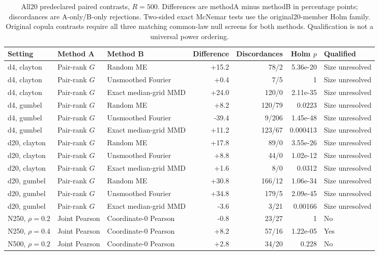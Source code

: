 \begin{table}[t]
\centering
\scriptsize
\caption{All20 predeclared paired contrasts, $R=500$. Differences are methodA minus methodB in percentage points; discordances are A-only/B-only rejections. Two-sided exact McNemar tests use the original20-member Holm family. Original copula contrasts require all three matching common-law null screens for both methods. Qualification is not a universal power ordering.}
\label{tab:dependence-paired-contrasts}
{\setlength{\tabcolsep}{8pt}\renewcommand{\arraystretch}{1.2}
\begin{tabular}{lllrrrl}
\toprule
Setting & Method A & Method B & Difference & Discordances & Holm $p$ & Qualified\\
\midrule
d4, clayton & Pair-rank $G$ & Random ME & +15.2 & 78/2 & 5.36e-20 & Size unresolved\\
d4, clayton & Pair-rank $G$ & Unsmoothed Fourier & +0.4 & 7/5 & 1 & Size unresolved\\
d4, clayton & Pair-rank $G$ & Exact median-grid MMD & +24.0 & 120/0 & 2.11e-35 & Size unresolved\\
d4, gumbel & Pair-rank $G$ & Random ME & +8.2 & 120/79 & 0.0223 & Size unresolved\\
d4, gumbel & Pair-rank $G$ & Unsmoothed Fourier & -39.4 & 9/206 & 1.45e-48 & Size unresolved\\
d4, gumbel & Pair-rank $G$ & Exact median-grid MMD & +11.2 & 123/67 & 0.000413 & Size unresolved\\
d20, clayton & Pair-rank $G$ & Random ME & +17.8 & 89/0 & 3.55e-26 & Size unresolved\\
d20, clayton & Pair-rank $G$ & Unsmoothed Fourier & +8.8 & 44/0 & 1.02e-12 & Size unresolved\\
d20, clayton & Pair-rank $G$ & Exact median-grid MMD & +1.6 & 8/0 & 0.0312 & Size unresolved\\
d20, gumbel & Pair-rank $G$ & Random ME & +30.8 & 166/12 & 1.06e-34 & Size unresolved\\
d20, gumbel & Pair-rank $G$ & Unsmoothed Fourier & +34.8 & 179/5 & 2.09e-45 & Size unresolved\\
d20, gumbel & Pair-rank $G$ & Exact median-grid MMD & -3.6 & 3/21 & 0.00166 & Size unresolved\\
N250, $\rho=0.2$ & Joint Pearson & Coordinate-0 Pearson & -0.8 & 23/27 & 1 & No\\
N250, $\rho=0.4$ & Joint Pearson & Coordinate-0 Pearson & +8.2 & 57/16 & 1.22e-05 & Yes\\
N500, $\rho=0.2$ & Joint Pearson & Coordinate-0 Pearson & +2.8 & 34/20 & 0.228 & No\\

\end{tabular}}
\end{table}
